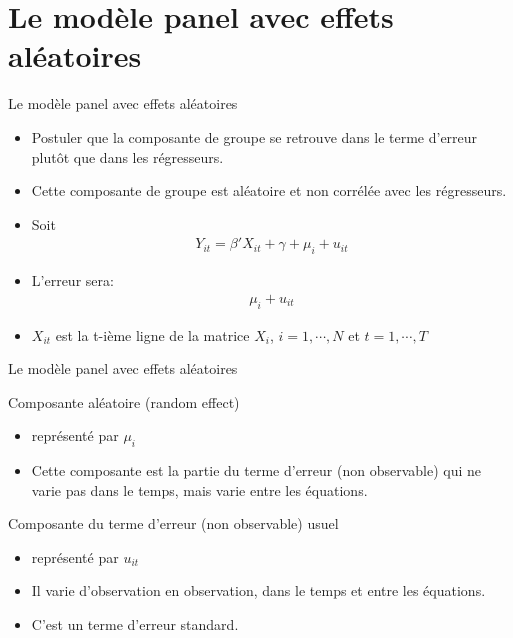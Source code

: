 \documentclass{beamer}
\begin{document}
\section{Le modèle panel avec effets aléatoires}
\frame{\tableofcontents[current]}
\begin{frame}{Le modèle panel avec effets aléatoires}
\begin{itemize}
\item Postuler que la composante de groupe se retrouve dans le terme d’erreur plutôt que dans les régresseurs.
\item Cette composante de groupe est aléatoire et non corrélée avec les régresseurs.
\item Soit
\begin{align*}
Y_{it}=\beta'X_{it}+\gamma +\mu_i+u_{it}
\end{align*}
\item L'erreur sera:
\begin{align*}
\mu_i+u_{it}
\end{align*}
\item $X_{it}$ est la t-ième ligne de la matrice $X_i$, $i=1,\cdots,N$ et $t=1,\cdots,T$
\end{itemize}

\end{frame}


\begin{frame}{Le modèle panel avec effets aléatoires}
\begin{block}{Composante aléatoire (random effect)}
\begin{itemize}
\item représenté par $\mu_i$
\item Cette composante est la partie du terme d’erreur (non observable) qui ne varie pas dans le temps, mais varie entre les équations. 
\end{itemize}
\end{block}
\begin{block}{Composante du terme d’erreur (non observable) usuel}
\begin{itemize}
\item représenté par $u_{it}$
\item Il varie d’observation en observation, dans le temps et entre les équations.
\item C’est un terme d’erreur standard.
\end{itemize}
\end{block}
\end{frame}
\end{document}
